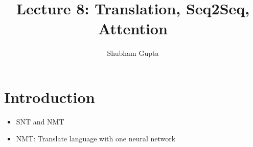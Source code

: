 \documentclass[a4paper]{article}
\title{Lecture 8: Translation, Seq2Seq, Attention}
\author{Shubham Gupta}
\begin{document}
\maketitle
\section{Introduction}
\begin{itemize}
    \item SNT and NMT
    \item NMT: Translate language with one neural network
\end{itemize}
\end{document}
